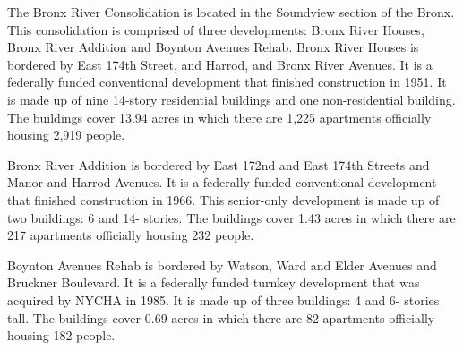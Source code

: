 The Bronx River Consolidation is located in the Soundview section of the Bronx. This consolidation is comprised of three developments: Bronx River Houses, Bronx River Addition and Boynton Avenues Rehab. Bronx River Houses is bordered by East 174th Street, and Harrod, and Bronx River Avenues. It is a federally funded conventional development that finished construction in 1951. It is made up of nine 14-story residential buildings and one non-residential building. The buildings cover 13.94 acres in which there are 1,225 apartments officially housing 2,919 people.   \par \vspace{.7\baselineskip} \par \vspace{.7\baselineskip}Bronx River Addition is bordered by East 172nd and East 174th Streets and Manor and Harrod Avenues. It is a federally funded conventional development that finished construction in 1966. This senior-only development is made up of two buildings: 6 and 14- stories. The buildings cover 1.43 acres in which there are 217 apartments officially housing 232 people.   \par \vspace{.7\baselineskip}Boynton Avenues Rehab is bordered by Watson, Ward and Elder Avenues and Bruckner Boulevard. It is a federally funded turnkey development that was acquired by NYCHA in 1985. It is made up of three buildings: 4 and 6- stories tall. The buildings cover 0.69 acres in which there are 82 apartments officially housing 182 people.